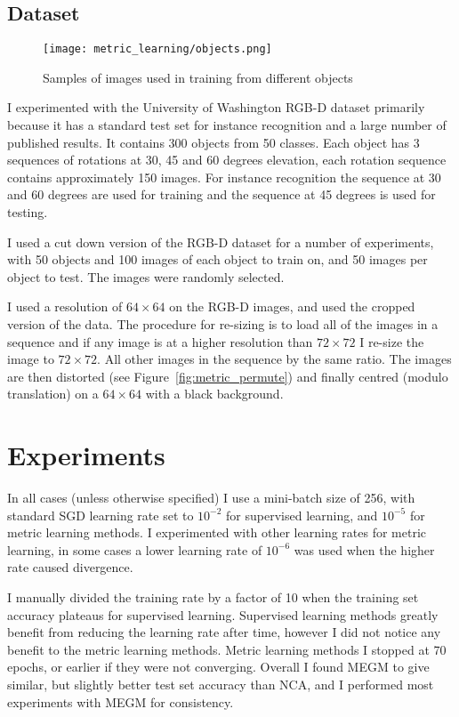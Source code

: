 \subsection {Dataset}

\begin{figure}[h]
\centering
\texttt{[image: metric\_learning/objects.png]}
\caption{Samples of images used in training from different objects}
\label{fig:metric_dataset}
\end{figure}

I experimented with the University of Washington RGB-D dataset primarily because it has a standard test set for instance recognition and a large number of published results. It contains 300 objects from 50 classes. Each object has 3 sequences of rotations at 30, 45 and 60 degrees elevation, each rotation sequence contains approximately 150 images. For instance recognition the sequence at 30 and 60 degrees are used for training and the sequence at 45 degrees is used for testing. 

I used a cut down version of the RGB-D dataset for a number of experiments, with 50 objects and 100 images of each object to train on, and 50 images per object to test. The images were randomly selected.

I used a resolution of $ 64\times64 $ on the RGB-D images, and used the cropped version of the data. The procedure for re-sizing is to load all of the images in a sequence and if any image is at a higher resolution than $ 72\times72 $ I re-size the image to $ 72\times72 $. All other images in the sequence by the same ratio. The images are then distorted (see Figure~\ref{fig:metric_permute}) and finally centred (modulo translation) on a  $ 64\times64 $ with a black background.


\section {Experiments}


In all cases (unless otherwise specified) I use a mini-batch size of 256, with standard \gls{SGD} learning rate set to $ 10^{-2} $ for supervised learning, and $ 10^{-5} $ for metric learning methods. I experimented with other learning rates for metric learning, in some cases a lower learning rate of $ 10^{-6} $ was used when the higher rate caused divergence.

I manually divided the training rate by a factor of 10 when the training set accuracy plateaus for supervised learning. Supervised learning methods greatly benefit from reducing the learning rate after time, however I did not notice any benefit to the metric learning methods. Metric learning methods I stopped at 70 epochs, or earlier if they were not converging. Overall I found \gls{MEGM} to give similar, but slightly better test set accuracy than \gls{NCA}, and I performed most experiments with \gls{MEGM} for consistency.



